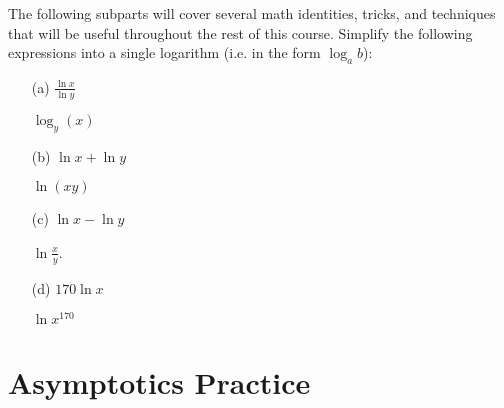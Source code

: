 \documentclass{article}
\begin{document}
The following subparts will cover several math identities, tricks, and techniques that will be useful throughout the rest of this course.
Simplify the following expressions into a single logarithm (i.e. in the form $\log_{a}b$):
    \begin{itemize}
        \item [(a)] $\frac{\ln{x}}{\ln{y}}$
            \begin{answer}
                $\log_{y}(x)$
            \end{answer}

        \item [(b)] $\ln{x} + \ln{y}$
            \begin{answer}
                $\ln(xy)$
            \end{answer}

        \item [(c)] $\ln{x} - \ln{y}$
            \begin{answer}
                $\ln{\frac{x}{y}}$.
            \end{answer}

        \item [(d)] $170 \ln{x}$ 
            \begin{answer}
                $\ln{x^{170}}$
            \end{answer}
    \end{itemize}

\newpage
\section*{Asymptotics Practice}
\end{document}
